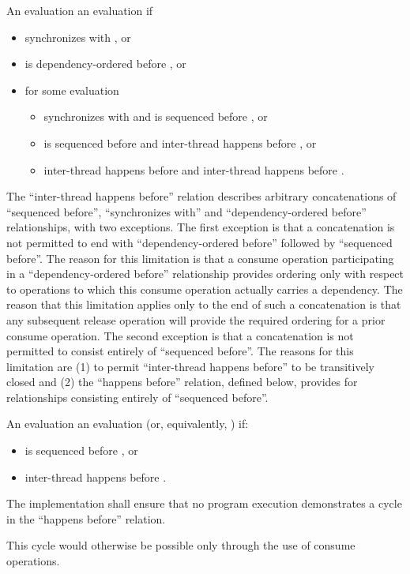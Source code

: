 \pnum
An evaluation   an evaluation 
if
\begin{itemize}
\item
   synchronizes with , or
\item
   is dependency-ordered before , or
\item
  for some evaluation 
  \begin{itemize}
  \item
     synchronizes with  and 
    is sequenced before , or
  \item
     is sequenced before  and 
    inter-thread happens before , or
  \item
     inter-thread happens before  and 
    inter-thread happens before .
  \end{itemize}
\end{itemize}
\begin{note} The ``inter-thread happens before'' relation describes arbitrary
concatenations of ``sequenced before'', ``synchronizes with'' and
``dependency-ordered before'' relationships, with two exceptions. The first
exception is that a concatenation is not permitted to end with
``dependency-ordered before'' followed by ``sequenced before''. The reason for
this limitation is that a consume operation participating in a
``dependency-ordered before'' relationship provides ordering only with respect
to operations to which this consume operation actually carries a dependency. The
reason that this limitation applies only to the end of such a concatenation is
that any subsequent release operation will provide the required ordering for a
prior consume operation. The second exception is that a concatenation is not
permitted to consist entirely of ``sequenced before''. The reasons for this
limitation are (1) to permit ``inter-thread happens before'' to be transitively
closed and (2) the ``happens before'' relation, defined below, provides for
relationships consisting entirely of ``sequenced before''. \end{note}

\pnum
An evaluation   an evaluation 
(or, equivalently,   ) if:
\begin{itemize}
\item {} is sequenced before , or
\item {} inter-thread happens before .
\end{itemize}
The implementation shall ensure that no program execution demonstrates a cycle
in the ``happens before'' relation. \begin{note} This cycle would otherwise be
possible only through the use of consume operations. \end{note}

